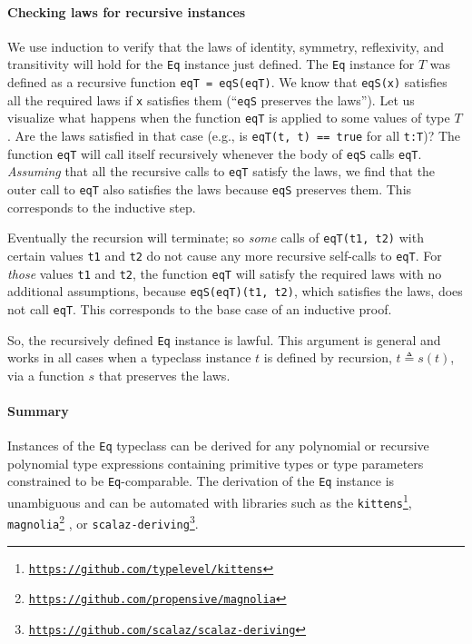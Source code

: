 \paragraph{Checking laws for recursive instances}

We use induction to verify that the laws of identity, symmetry, reflexivity,
and transitivity will hold for the \lstinline!Eq! instance just defined.
The \lstinline!Eq! instance for $T$ was defined as a recursive function
\lstinline!eqT = eqS(eqT)!. We know that \lstinline!eqS(x)! satisfies
all the required laws if \lstinline!x! satisfies them (\textsf{``}\lstinline!eqS!
preserves the laws\textsf{''}). Let us visualize what happens when the function
\lstinline!eqT! is applied to some values of type $T$. Are the laws
satisfied in that case (e.g., is \lstinline!eqT(t, t) == true! for
all \lstinline!t:T!)? The function \lstinline!eqT! will call itself
recursively whenever the body of \lstinline!eqS! calls \lstinline!eqT!.
\emph{Assuming} that all the recursive calls to \lstinline!eqT! satisfy
the laws, we find that the outer call to \lstinline!eqT! also satisfies
the laws because \lstinline!eqS! preserves them. This corresponds
to the inductive step.

Eventually the recursion will terminate; so \emph{some} calls of \lstinline!eqT(t1, t2)!
with certain values \lstinline!t1! and \lstinline!t2! do not cause
any more recursive self-calls to \lstinline!eqT!. For \emph{those}
values \lstinline!t1! and \lstinline!t2!, the function \lstinline!eqT!
will satisfy the required laws with no additional assumptions, because
\lstinline!eqS(eqT)(t1, t2)!, which satisfies the laws, does not
call \lstinline!eqT!. This corresponds to the base case of an inductive
proof. 

So, the recursively defined \lstinline!Eq! instance is lawful. This
argument is general and works in all cases when a typeclass instance
$t$ is defined by recursion, $t\triangleq s(t)$, via a function
$s$ that preserves the laws.

\paragraph{Summary}

Instances of the \lstinline!Eq! typeclass can be derived for any
polynomial or recursive polynomial type expressions containing primitive
types or type parameters constrained to be \lstinline!Eq!-comparable.
The derivation of the \lstinline!Eq! instance is unambiguous and
can be automated with libraries such as the \texttt{kittens}\footnote{\texttt{\href{https://github.com/typelevel/kittens}{https://github.com/typelevel/kittens}}},
\texttt{magnolia}\footnote{\texttt{\href{https://github.com/propensive/magnolia}{https://github.com/propensive/magnolia}}}
, or \texttt{scalaz-deriving}\footnote{\texttt{\href{https://github.com/scalaz/scalaz-deriving}{https://github.com/scalaz/scalaz-deriving}}}.

